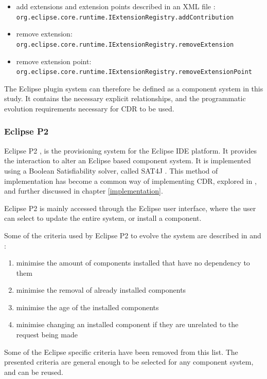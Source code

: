 \begin{itemize}
  \item add extensions and extension points described in an XML file : \verb+org.eclipse.core.runtime.IExtensionRegistry.addContribution+
  \item remove extension: \verb+org.eclipse.core.runtime.IExtensionRegistry.removeExtension+
  \item remove extension point: \verb+org.eclipse.core.runtime.IExtensionRegistry.removeExtensionPoint+
\end{itemize}

The Eclipse plugin system can therefore be defined as a component system in this study.
It contains the necessary explicit relationships, and the programmatic evolution requirements necessary for CDR to be used.

\subsubsection{Eclipse P2}
Eclipse P2 \cite{le_berre_dependency_2009}, \cite{leBerre2010} is the provisioning system for the Eclipse IDE platform.
It provides the interaction to alter an Eclipse based component system. 
It is implemented using a Boolean Satisfiability solver, called SAT4J \cite{le2010sat4j}.
This method of implementation has become a common way of implementing CDR, explored in \cite{Berre2008}, and further discussed in chapter \ref{implementation}.

Eclipse P2 is mainly accessed through the Eclipse user interface, where the user can select to update the entire system, or install a component.

Some of the criteria used by Eclipse P2 to evolve the system are described in \cite{le_berre_dependency_2009} and \cite{leBerre2010}:
\begin{enumerate}
  \item minimise the amount of components installed that have no dependency to them 
  \item minimise the removal of already installed components
  \item minimise the age of the installed components
  \item minimise changing an installed component if they are unrelated to the request being made
\end{enumerate} 

Some of the Eclipse specific criteria have been removed from this list.
The presented criteria are general enough to be selected for any component system, and can be reused.

